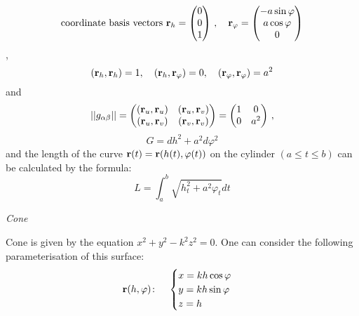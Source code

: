 \documentclass[12pt]{article}
\theoremstyle{theorem}
\numberwithin{equation}{section}
\begin{document}
  \begin{equation}\label{cyl1}
\hbox {coordinate basis vectors\,\,}
  {\bf r}_h=\begin{pmatrix}
        0\\
        0\\
        1\\
   \end{pmatrix}
\,,
\quad
  {\bf r}_\varphi=\begin{pmatrix}
        -a\sin\varphi\\
        a\cos\varphi\\
          0\\
   \end{pmatrix}
 \end{equation},
            $$
     ({\bf r}_h,{\bf r}_h)=1,\quad
     ({\bf r}_h,{\bf r}_\varphi)=0,\quad
     ({\bf r}_\varphi,{\bf r}_\varphi)=a^2
            $$
and
\begin{equation*}\label{formula forfirstformcyl}
||g_{\alpha\beta}||=
   \begin{pmatrix}
   ({\bf r}_u,{\bf r}_u) & ({\bf r}_u,{\bf r}_v) \\
   ({\bf r}_u,{\bf r}_v) & ({\bf r}_v,{\bf r}_v) \\
   \end{pmatrix}=   \begin{pmatrix}
   1 & 0 \\
   0& a^2 \\
   \end{pmatrix}\,,
\end{equation*}
\begin{equation}\label{formula forfirstformcyl}
   G=dh^2+a^2d\varphi^2
\end{equation}
  and the length of the curve ${\bf r}(t)={\bf r} (h(t), \varphi(t))$ on the cylinder
    $(a\leq t\leq b)$
  can be calculated by the formula:
               \begin{equation}
             L=
             \int_a^b\sqrt{h_t^2+a^2\varphi_t}dt
               \end{equation}



\medskip

  \centerline {\it Cone}
 Cone is given by the equation $x^2+y^2-k^2z^2=0$.
One can consider the following
parameterisation
 of this surface:
\begin{equation}\label{surfacecone}
  {\bf r}(h,\varphi)\colon\quad
  \begin{cases}
  x=kh\cos\varphi\\
  y=kh\sin\varphi\\
  z=h\\
  \end{cases}
\end{equation}
\end{document}
